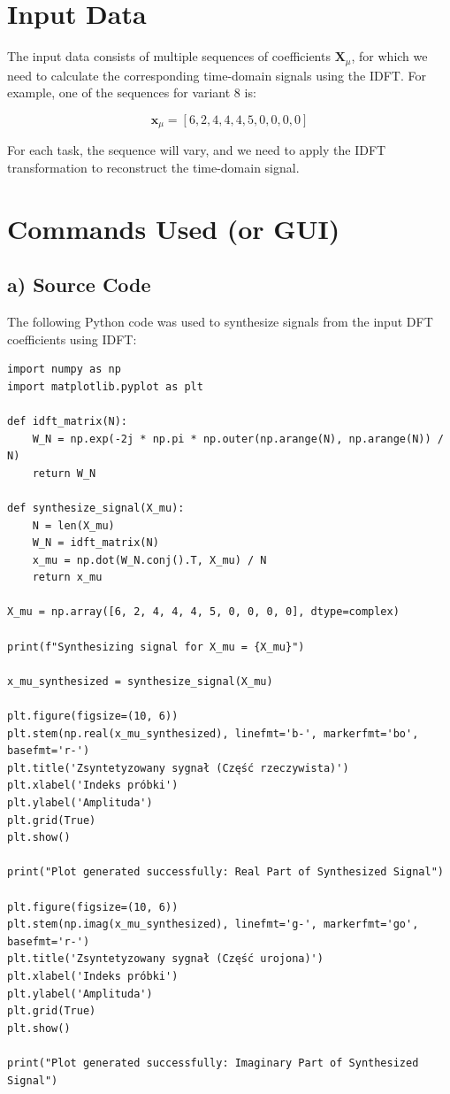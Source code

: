 \documentclass[12pt]{article}
\begin{document}
\section{Input Data}

The input data consists of multiple sequences of coefficients \( \mathbf{X}_\mu \), for which we need to calculate the corresponding time-domain signals using the IDFT. For example, one of the sequences for variant 8 is:

\[
\mathbf{x}_\mu = [6, 2, 4, 4, 4,5,0, 0, 0, 0]
\]

For each task, the sequence will vary, and we need to apply the IDFT transformation to reconstruct the time-domain signal.

\section{Commands Used (or GUI)}

\subsection{a) Source Code}

The following Python code was used to synthesize signals from the input DFT coefficients using IDFT:

\begin{verbatim}
import numpy as np
import matplotlib.pyplot as plt

def idft_matrix(N):
    W_N = np.exp(-2j * np.pi * np.outer(np.arange(N), np.arange(N)) / N)
    return W_N

def synthesize_signal(X_mu):
    N = len(X_mu)
    W_N = idft_matrix(N)
    x_mu = np.dot(W_N.conj().T, X_mu) / N
    return x_mu

X_mu = np.array([6, 2, 4, 4, 4, 5, 0, 0, 0, 0], dtype=complex)

print(f"Synthesizing signal for X_mu = {X_mu}")

x_mu_synthesized = synthesize_signal(X_mu)

plt.figure(figsize=(10, 6))
plt.stem(np.real(x_mu_synthesized), linefmt='b-', markerfmt='bo', basefmt='r-')
plt.title('Zsyntetyzowany sygnał (Część rzeczywista)')
plt.xlabel('Indeks próbki')
plt.ylabel('Amplituda')
plt.grid(True)
plt.show()

print("Plot generated successfully: Real Part of Synthesized Signal")

plt.figure(figsize=(10, 6))
plt.stem(np.imag(x_mu_synthesized), linefmt='g-', markerfmt='go', basefmt='r-')
plt.title('Zsyntetyzowany sygnał (Część urojona)')
plt.xlabel('Indeks próbki')
plt.ylabel('Amplituda')
plt.grid(True)
plt.show()

print("Plot generated successfully: Imaginary Part of Synthesized Signal")
\end{verbatim}
\end{document}
